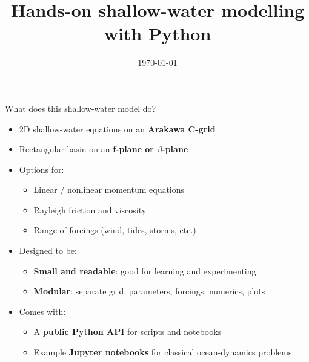 \documentclass[]{beamer}
\title[Shallow-water model]{Hands-on shallow-water modelling with Python}
\author{}
\date{\today}
\begin{document}
\begin{frame}
  \titlepage
\end{frame}



\begin{frame}{What does this shallow-water model do?}
  \begin{itemize}
    \item 2D shallow-water equations on an \textbf{Arakawa C-grid}
    \item Rectangular basin on an \textbf{f-plane or $\beta$-plane}
    \item Options for:
    \begin{itemize}
      \item Linear / nonlinear momentum equations
      \item Rayleigh friction and viscosity
      \item Range of forcings (wind, tides, storms, etc.)
    \end{itemize}
    \item Designed to be:
    \begin{itemize}
      \item \textbf{Small and readable}: good for learning and experimenting
      \item \textbf{Modular}: separate grid, parameters, forcings, numerics, plots
    \end{itemize}
    \item Comes with:
    \begin{itemize}
      \item A \textbf{public Python API} for scripts and notebooks
      \item Example \textbf{Jupyter notebooks} for classical ocean-dynamics problems
    \end{itemize}
  \end{itemize}
\end{frame}
\end{document}
